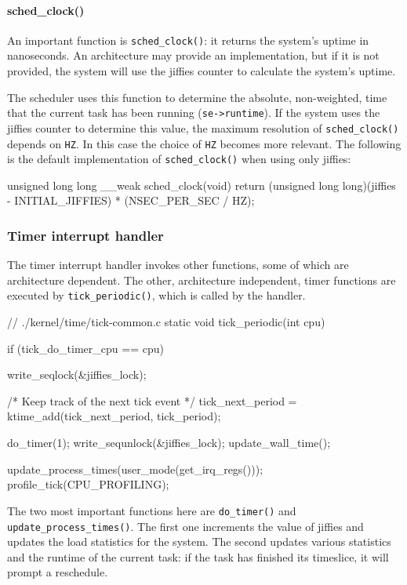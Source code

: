 \paragraph{sched\_clock()}
\label{sched_clock}
An important function is \verb|sched_clock()|: it returns the system's uptime in nanoseconds. An architecture may provide an implementation, but if it is not provided, the system will use the jiffies counter to calculate the system's uptime.

The scheduler uses this function to determine the absolute, non-weighted, time that the current task has been running (\verb|se->runtime|). If the system uses the jiffies counter to determine this value, the maximum resolution of \verb|sched_clock()| depends on \texttt{HZ}. In this case the choice of \texttt{HZ} becomes more relevant.
The following is the default implementation of \verb|sched_clock()| when using only jiffies:
\begin{code}
unsigned long long __weak sched_clock(void)
{
	return (unsigned long long)(jiffies - INITIAL_JIFFIES)
					* (NSEC_PER_SEC / HZ);
}
\end{code}

\subsubsection{Timer interrupt handler}

The timer interrupt handler invokes other functions, some of which are architecture dependent. The other, architecture independent, timer functions are executed by \verb|tick_periodic()|, which is called by the handler.

\begin{code}
// ./kernel/time/tick-common.c
static void tick_periodic(int cpu)
{
	if (tick_do_timer_cpu == cpu) {
		write_seqlock(&jiffies_lock);

		/* Keep track of the next tick event */
		tick_next_period = ktime_add(tick_next_period, tick_period);

		do_timer(1);
		write_sequnlock(&jiffies_lock);
		update_wall_time();
	}

	update_process_times(user_mode(get_irq_regs()));
	profile_tick(CPU_PROFILING);
}
\end{code}
The two most important functions here are \verb|do_timer()| and \verb|update_process_times()|. The first one increments the value of jiffies and updates the load statistics for the system. The second updates various statistics and the runtime of the current task: if the task has finished its timeslice, it will prompt a reschedule. %

